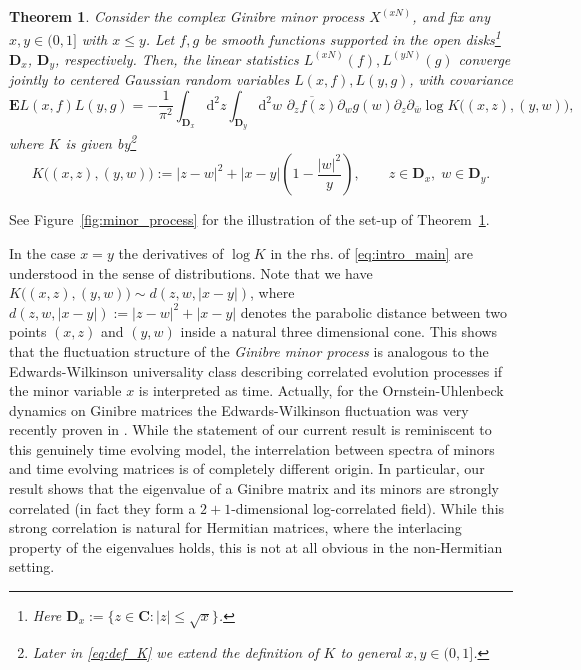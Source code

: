 \documentclass[10pt]{amsart}
\newtheorem{theorem}{Theorem}[section]
\numberwithin{equation}{section}
\newcommand{\dif}{\mathrm{d}}
\newcommand{\E}{\mathbf{E}}
\newcommand{\C}{\mathbf{C}}
\newcommand{\DD}{\mathbf{D}}
\begin{document}
\begin{theorem}\label{theo:intro}
Consider the complex Ginibre minor process $X^{(xN)}$, and fix any $x,y\in (0,1]$ with $x\le y$. Let $f,g$ be smooth functions supported in the open disks\footnote{Here $\DD_x:=\{z\in\C:|z|\le \sqrt{x}\}$.} $\DD_x$, $\DD_y$, respectively. Then, the linear statistics $L^{(xN)}(f), L^{(yN)}(g)$ converge jointly to centered Gaussian random variables $L(x,f), L(y,g)$, with covariance
\begin{equation}
\E L(x,f) L(y,g)= -\frac{1}{\pi^2} \int_{\DD_x} \!\!\dif^2 z\int_{\DD_y}\!\!\dif^2 w\,\, \overline{\partial_z f(z)}\partial_w g(w) \partial_z\partial_{\overline{w}} \log K\big((x,z),(y,w)\big),
\label{eq:intro_main}
\end{equation}
where $K$ is given by\footnote{Later in \eqref{eq:def_K} we extend the definition of $K$ to general $x,y\in(0,1]$.}
\begin{equation}
K\big((x,z),(y,w)\big):=|z-w|^2+|x-y|\left(1-\frac{|w|^2}{y}\right), \qquad z\in \DD_x, \; w\in \DD_y.
\end{equation}
\end{theorem}

See Figure~\ref{fig:minor_process} for the illustration of the set-up of Theorem~\ref{theo:intro}.

In the case $x=y$ the derivatives of $\log K$ in the rhs. of \eqref{eq:intro_main} are understood in the sense of distributions. Note that we have $K\big((x,z),(y,w)\big)\sim d(z,w,|x-y|)$, where $d(z,w,|x-y|):=|z-w|^2+|x-y|$ denotes the parabolic distance between two points $(x,z)$ and $(y,w)$ inside a natural three dimensional cone. This shows that the fluctuation structure of the  \emph{Ginibre minor process} is analogous to the Edwards-Wilkinson universality class describing correlated evolution processes if the minor variable $x$ is interpreted as time. Actually, for the Ornstein-Uhlenbeck dynamics on Ginibre matrices the Edwards-Wilkinson fluctuation was very recently proven in \cite{bourgade2024fluctuations}. While the statement of our current result is reminiscent to this genuinely time evolving model, the interrelation between spectra of minors and time evolving matrices is of completely different origin. In particular, our result shows that the eigenvalue of a Ginibre matrix and its minors are strongly correlated (in fact they form a $2+1$-dimensional log-correlated field). While this strong correlation is natural for Hermitian matrices, where the interlacing property of the eigenvalues holds, this is not at all obvious in the non-Hermitian setting.
   
\end{document}
